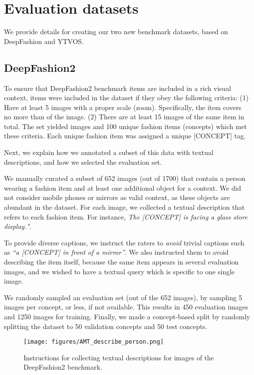 \documentclass[runningheads]{llncs}
\newcommand{\concept}{[CONCEPT]}
\begin{document}
\section{Evaluation datasets}
\label{sec_datasets_suppl}
We provide details for creating our two new benchmark datasets, based on DeepFashion and YTVOS.

\subsection{DeepFashion2}
\label{sec_deepfashion_suppl}

To ensure that DeepFashion2 benchmark items are included in a rich visual context, items were included in the dataset if they obey the following criteria: (1) Have at least 5 images with a proper scale (zoom). Specifically, the item covers no more than  of the image. (2) There are at least 15 images of the same item in total. The set yielded  images and 100 unique fashion items (concepts) which met these criteria. Each unique fashion item was assigned a unique \concept{} tag.

Next, we explain how we annotated a subset of this data with textual descriptions, and how we selected the evaluation set.


We manually curated a subset of 652 images (out of 1700) that contain a person wearing a fashion item and at least one additional object for a context.
We did not consider mobile phones or mirrors as valid context, as these objects are abundant in the dataset. For each image, we collected a textual description that refers to each fashion item. For instance, \textit{The \concept{} is facing a glass store display."}.

To provide diverse captions, we instruct the raters to \textit{avoid} trivial captions such as \textit{``a \concept{} in front of a mirror''}. We also instructed them to avoid describing the item itself, because the same item appears in several evaluation images, and we wished to have a textual query which is specific to one single image.

We randomly sampled an evaluation set (out of the 652 images), by sampling 5 images per concept, or less, if not available.
This results in 450 evaluation images and 1250 images for training. Finally, we made a concept-based split by randomly splitting the dataset to 50 validation concepts and 50 test concepts.

\begin{figure}[htbp]
\label{AMT_describe_person}
    \centering
    \texttt{[image: figures/AMT\_describe\_person.png]} \hspace{-10pt}
    \vspace{-10pt}
    \caption{
Instructions for collecting textual descriptions for images of the DeepFashion2 benchmark.
    }
    \label{fig_AMT_describe_person}
    \vspace{-10pt}
\end{figure}
\end{document}
